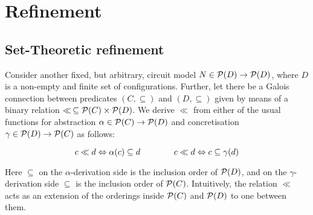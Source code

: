 \section{Refinement}

\subsection{Set-Theoretic refinement}

Consider another fixed, but arbitrary, circuit model $N \in \mathcal{P}(D) \rightarrow \mathcal{P}(D)$, where $D$ is a non-empty and finite set of configurations. Further, let there be a Galois connection between predicates $(C, \subseteq)$ and $(D, \subseteq)$ given by means of a binary relation $\ll \, \subseteq \mathcal{P}(C) \times \mathcal{P}(D)$. We derive $\ll$ from either of the usual functions for abstraction $\alpha \in \mathcal{P}(C) \rightarrow \mathcal{P}(D)$ and concretisation $\gamma \in \mathcal{P}(D) \rightarrow \mathcal{P}(C)$ as follows:

\begin{equation*}
c \ll d \Leftrightarrow \alpha(c) \subseteq d \quad\quad\quad\quad c \ll d \Leftrightarrow c \subseteq \gamma(d)
\end{equation*}

\noindent Here $\subseteq$ on the $\alpha$-derivation side is the inclusion order of $\mathcal{P}(D)$, and on the $\gamma$-derivation side $\subseteq$ is the inclusion order of $\mathcal{P}(C)$. Intuitively, the relation $\ll$ acts as an extension of the orderings inside $\mathcal{P}(C)$ and $\mathcal{P}(D)$ to one between them.




